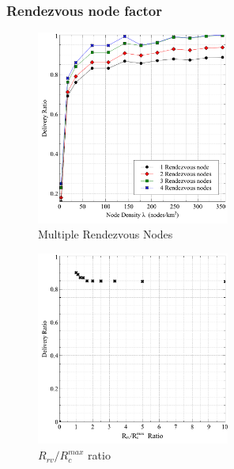 \documentclass[conference]{IEEEtran}
\begin{document}

\subsubsection{Rendezvous node factor}
\begin{figure}[!t]
	\centering
	\includegraphics[width=2.5in]{Graphs/MultipleRVs.pdf}
	\caption{Multiple Rendezvous Nodes}
	\label{Multiple Rendezvous Nodes}
\end{figure}
\begin{figure}[!t]
\centering
\includegraphics[width=2.5in]{Graphs/RcmaxRrv.pdf}
\caption{$R_{rv}/R_c^{max}$ ratio}
\label{RrvRcmaxRatio}
\end{figure}
\end{document}

